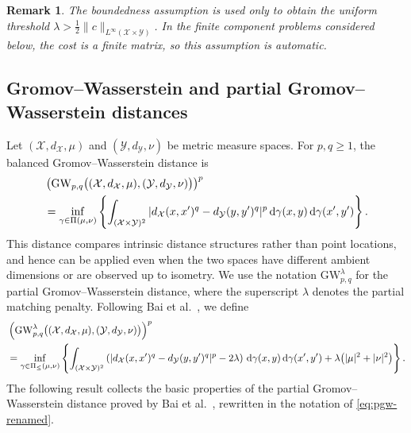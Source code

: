 \documentclass[a4paper,11pt]{article}
\numberwithin{equation}{section}
\newtheorem{rem}[thm]{Remark}
\newcommand{\GW}{\mathrm{GW}}
\newcommand{\dd}{\,\mathrm{d}}
\newcommand{\X}{\mathcal{X}}
\newcommand{\Y}{\mathcal{Y}}
\begin{document}
\begin{rem}\label{rem:bounded-cost}
The boundedness assumption is used only to obtain the uniform threshold
$\lambda > \frac12\|c\|_{L^\infty(\X\times\Y)}$. In the finite component problems considered below, the cost is a finite matrix, so this assumption is automatic.
\end{rem}


\subsection{Gromov--Wasserstein and partial Gromov--Wasserstein distances}\label{subsec:gw}

Let $(\X,d_{\X},\mu)$ and $(\Y,d_{\Y},\nu)$ be metric measure spaces. For $p,q \geq 1$, the balanced Gromov--Wasserstein distance is
\begin{align}\label{eq:gw-renamed}
  &\left(\GW_{p,q}\bigl((\X,d_{\X},\mu),(\Y,d_{\Y},\nu)\bigr)\right)^p \notag \\
  &= \inf_{\gamma \in \Pi(\mu,\nu)} \left\{\int_{(\X\times\Y)^2}|d_{\X}(x,x')^q-d_{\Y}(y,y')^q|^p\dd\gamma(x,y)\dd\gamma(x',y')\right\}.
\end{align}
This distance compares intrinsic distance structures rather than point locations, and hence can be applied even when the two spaces have different ambient dimensions or are observed up to isometry. We use the notation $\GW^{\lambda}_{p,q}$ for the partial Gromov--Wasserstein distance, where the superscript $\lambda$ denotes the partial matching penalty. Following Bai et al.~\cite{Bai2025}, we define
\begin{align}\label{eq:pgw-renamed}
  &\left(\GW^{\lambda}_{p,q}\bigl((\X,d_{\X},\mu),(\Y,d_{\Y},\nu)\bigr)\right)^p \notag \\
  &= \inf_{\gamma \in \Pi_{\leq}(\mu,\nu)} \left\{\int_{(\X\times\Y)^2}\left(|d_{\X}(x,x')^q-d_{\Y}(y,y')^q|^p-2\lambda\right)\dd\gamma(x,y)\dd\gamma(x',y') + \lambda\bigl(|\mu|^2+|\nu|^2\bigr) \right\}.
\end{align}
The following result collects the basic properties of the partial Gromov--Wasserstein distance proved by Bai et al.~\cite{Bai2025}, rewritten in the notation of \eqref{eq:pgw-renamed}.
\end{document}
